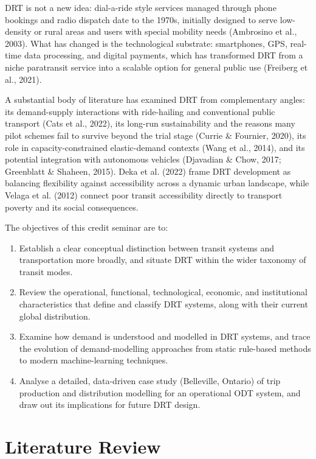 \documentclass[12pt]{article}
\begin{document}
DRT is not a new idea: dial-a-ride style services managed through phone bookings and
radio dispatch date to the 1970s, initially designed to serve low-density or rural
areas and users with special mobility needs (Ambrosino et al., 2003). What has
changed is the technological substrate: smartphones, GPS, real-time data
processing, and digital payments, which has transformed DRT from a niche paratransit
service into a scalable option for general public use (Freiberg et al., 2021).

A substantial body of literature has examined DRT from complementary angles: its
demand-supply interactions with ride-hailing and conventional public transport
(Cats et al., 2022), its long-run sustainability and the reasons many pilot schemes
fail to survive beyond the trial stage (Currie \& Fournier, 2020), its role in
capacity-constrained elastic-demand contexts (Wang et al., 2014), and its potential
integration with autonomous vehicles (Djavadian \& Chow, 2017; Greenblatt \&
Shaheen, 2015). Deka et al. (2022) frame DRT development as balancing flexibility
against accessibility across a dynamic urban landscape, while Velaga et al. (2012)
connect poor transit accessibility directly to transport poverty and its social
consequences.

The objectives of this credit seminar are to:
\begin{enumerate}[nosep]
  \item Establish a clear conceptual distinction between transit systems and
    transportation more broadly, and situate DRT within the wider taxonomy of
    transit modes.
  \item Review the operational, functional, technological, economic, and
    institutional characteristics that define and classify DRT systems, along with
    their current global distribution.
  \item Examine how demand is understood and modelled in DRT systems, and trace the
    evolution of demand-modelling approaches from static rule-based methods to
    modern machine-learning techniques.
  \item Analyse a detailed, data-driven case study (Belleville, Ontario) of trip
    production and distribution modelling for an operational ODT system, and draw
    out its implications for future DRT design.
\end{enumerate}

\section{Literature Review}
\end{document}
